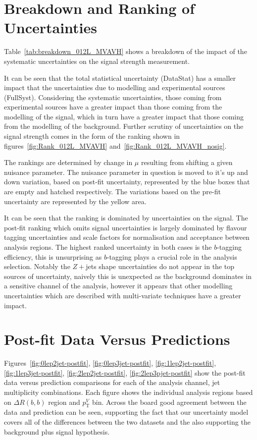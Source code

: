 \section{Breakdown and Ranking of Uncertainties}
Table~\ref{tab:breakdown_012L_MVAVH} shows a breakdown of the impact of the
systematic uncertainties on the signal strength measurement.

It can be seen that the total statistical uncertainty (DataStat) has a smaller
impact that the uncertainties due to modelling and experimental sources
(FullSyst). Considering the systematic uncertainties, those coming from
experimental sources have a greater impact than those coming from the modelling
of the signal, which in turn have a greater impact  that those coming from the
modelling of the background. Further scrutiny of uncertainties on the signal
strength comes in the form of the ranking shown in
figures~\ref{fig:Rank_012L_MVAVH} and~\ref{fig:Rank_012L_MVAVH_nosig}.

The rankings are determined by change in $\mu$ resulting from shifting a given
nuisance parameter. The nuisance parameter in question is moved to it's up and
down variation, based on post-fit uncertainty, represented by the blue boxes
that are empty and hatched respectively. The variations based on the pre-fit
uncertainty are represented by the yellow area.

It can be seen that the ranking is dominated by uncertainties on the signal. The
post-fit ranking which omits signal uncertainties is largely dominated by
flavour tagging uncertainties and scale factors for normalisation and acceptance
between analysis regions. The highest ranked uncertainty in both cases is the
$b$-tagging efficiency, this is unsurprising as $b$-tagging plays a crucial role
in the analysis selection. Notably the $Z+$jets shape uncertainties do not
appear in the top sources of uncertainty, naively this is unexpected as the
background dominates in a sensitive channel of the analysis, however it appears
that other modelling uncertainties which are described with multi-variate
techniques have a greater impact.

\section{Post-fit Data Versus Predictions}
Figures~\ref{fig:0lep2jet-postfit}, \ref{fig:0lep3jet-postfit},
\ref{fig:1lep2jet-postfit}, \ref{fig:1lep3jet-postfit},
\ref{fig:2lep2jet-postfit}, \ref{fig:2lep3pjet-postfit} show the post-fit data
versus prediction comparisons for each of the analysis channel, jet multiplicity
combinations. Each figure shows the individual analysis regions based on
$\Delta R(b, b)$ region and $p_{\mathrm{T}}^V$ bin. Across the board good
agreement between the data and prediction can be seen, supporting the fact that
our uncertainty model covers all of the differences between the two datasets and
the also supporting the background plus signal hypothesis.







